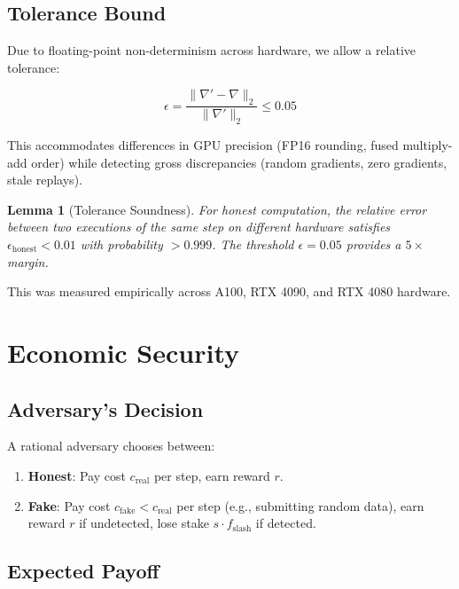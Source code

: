 \documentclass[11pt,letterpaper]{article}
\newtheorem{lemma}[theorem]{Lemma}
\begin{document}
\subsection{Tolerance Bound}

Due to floating-point non-determinism across hardware, we allow a relative tolerance:

\begin{equation}
    \epsilon = \frac{\|\nabla' - \nabla\|_2}{\|\nabla'\|_2} \leq 0.05
    \label{eq:tolerance}
\end{equation}

This accommodates differences in GPU precision (FP16 rounding, fused multiply-add order) while detecting gross discrepancies (random gradients, zero gradients, stale replays).

\begin{lemma}[Tolerance Soundness]
For honest computation, the relative error between two executions of the same step on different hardware satisfies $\epsilon_{\text{honest}} < 0.01$ with probability $>0.999$.  The threshold $\epsilon = 0.05$ provides a $5\times$ margin.
\end{lemma}

This was measured empirically across A100, RTX 4090, and RTX 4080 hardware.

\section{Economic Security}
\label{sec:economics}

\subsection{Adversary's Decision}

A rational adversary chooses between:
\begin{enumerate}
    \item \textbf{Honest}: Pay cost $c_{\text{real}}$ per step, earn reward $r$.
    \item \textbf{Fake}: Pay cost $c_{\text{fake}} < c_{\text{real}}$ per step (e.g., submitting random data), earn reward $r$ if undetected, lose stake $s \cdot f_{\text{slash}}$ if detected.
\end{enumerate}

\subsection{Expected Payoff}
\end{document}
